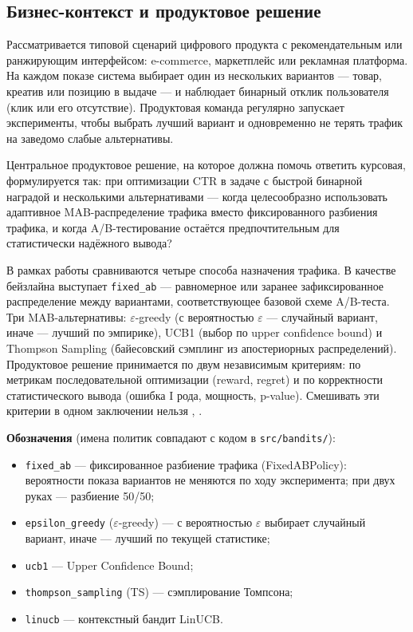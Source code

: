 \subsection{Бизнес-контекст и продуктовое решение}\label{ux431ux438ux437ux43dux435ux441-ux43aux43eux43dux442ux435ux43aux441ux442-ux438-ux43fux440ux43eux434ux443ux43aux442ux43eux432ux43eux435-ux440ux435ux448ux435ux43dux438ux435}

Рассматривается типовой сценарий цифрового продукта с рекомендательным или ранжирующим интерфейсом: e-commerce, маркетплейс или рекламная платформа. На каждом показе система выбирает один из нескольких вариантов --- товар, креатив или позицию в выдаче --- и наблюдает бинарный отклик пользователя (клик или его отсутствие). Продуктовая команда регулярно запускает эксперименты, чтобы выбрать лучший вариант и одновременно не терять трафик на заведомо слабые альтернативы.

Центральное продуктовое решение, на которое должна помочь ответить курсовая, формулируется так: при оптимизации CTR в задаче с быстрой бинарной наградой и несколькими альтернативами --- когда целесообразно использовать адаптивное MAB-распределение трафика вместо фиксированного разбиения трафика, и когда A/B-тестирование остаётся предпочтительным для статистически надёжного вывода?

В рамках работы сравниваются четыре способа назначения трафика. В качестве бейзлайна выступает \texttt{fixed\_ab} --- равномерное или заранее зафиксированное распределение между вариантами, соответствующее базовой схеме A/B-теста. Три MAB-альтернативы: $\varepsilon$-greedy (с вероятностью $\varepsilon$ --- случайный вариант, иначе --- лучший по эмпирике), UCB1 (выбор по upper confidence bound) и Thompson Sampling (байесовский сэмплинг из апостериорных распределений). Продуктовое решение принимается по двум независимым критериям: по метрикам последовательной оптимизации (reward, regret) и по корректности статистического вывода (ошибка I рода, мощность, p-value). Смешивать эти критерии в одном заключении нельзя \cite{ref13}, \cite{ref21}.

\textbf{Обозначения} (имена политик совпадают с кодом в \texttt{src/bandits/}):

\begin{itemize}
\tightlist
\item
  \texttt{fixed\_ab} --- фиксированное разбиение трафика (FixedABPolicy): вероятности показа вариантов не меняются по ходу эксперимента; при двух руках --- разбиение 50/50;
\item
  \texttt{epsilon\_greedy} ($\varepsilon$-greedy) --- с вероятностью $\varepsilon$ выбирает случайный вариант, иначе --- лучший по текущей статистике;
\item
  \texttt{ucb1} --- Upper Confidence Bound;
\item
  \texttt{thompson\_sampling} (TS) --- сэмплирование Томпсона;
\item
  \texttt{linucb} --- контекстный бандит LinUCB.
\end{itemize}

